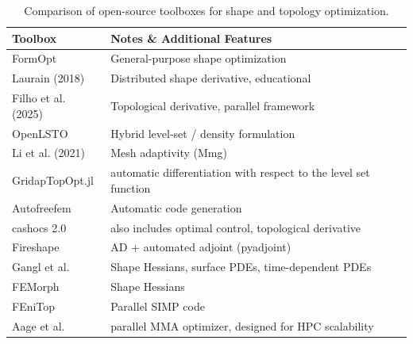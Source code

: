 \documentclass[preprint,9pt]{elsarticle}
\begin{document}
		\begin{table}[h]
			\centering
			\footnotesize
			\begin{tabularx}{\textwidth}{l l l}
			\toprule
			\textbf{Toolbox}  & \textbf{Notes \& Additional Features} \\
			\midrule
			
			FormOpt 
			& General-purpose shape optimization \\
			
			Laurain (2018) \cite{MR3843884} 
			& Distributed shape derivative, educational \\
	
			Filho et al. (2025) \cite{MR4916810} 
			& Topological derivative, parallel framework \\
	
			OpenLSTO \cite{Kambampati2018}
			& Hybrid level-set / density formulation\\
	
			Li et al. (2021) \cite{LI2021103561} 
			& Mesh adaptivity (Mmg) \\
	
			GridapTopOpt.jl \cite{Wegert2025} 
			& automatic differentiation with respect to the level
			set function \\
	
			Autofreefem \cite{Allaire2024} 
			& Automatic code generation \\
			
			cashocs 2.0 \cite{BLAUTH2021100646,BLAUTH2023101577} 
			& also includes optimal control, topological derivative \\
			
			Fireshape \cite{MR4244971} 
			& AD + automated adjoint (pyadjoint) \\
	
			Gangl et al. \cite{MR4233697} 
			& Shape Hessians, surface PDEs, time-dependent PDEs \\
	
			FEMorph \cite{Schmidt1} 
			& Shape Hessians \\
	
			FEniTop \cite{Jia2024} 
			& Parallel SIMP code \\
					
			Aage et al. \cite{MR3334238} 
			& parallel MMA optimizer, designed for HPC scalability \\
		
			
			\bottomrule
			\end{tabularx}
			\caption{Comparison of open-source toolboxes for shape and topology optimization. }
			\label{tab3}
			\end{table}
\end{document}

